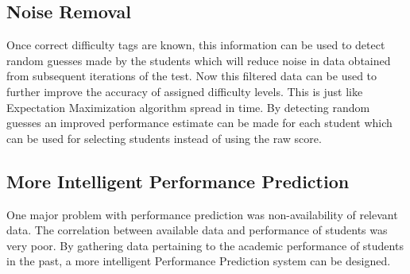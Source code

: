 \documentclass[12pt]{article}
\begin{document}
	\subsection{Noise Removal}
	Once correct difficulty tags are known, this information can be used
	to detect random guesses made by the students which will reduce noise
	in data obtained from subsequent iterations of the test. Now this filtered
	data can be used to further improve the accuracy of assigned difficulty
	levels. This is just like Expectation Maximization algorithm spread
	in time. By detecting random guesses an improved performance estimate
	can be made for each student which can be used for selecting students
	instead of using the raw score.
	
	\subsection{More Intelligent Performance Prediction}
	One major problem with performance prediction was non-availability
	of relevant data. The correlation between available data and performance
	of students was very poor. By gathering data pertaining to the academic
	performance of students in the past, a more intelligent Performance 
	Prediction system can be designed.
	
	\nocite{*}	
	
	\newpage
	\printbibliography[heading=bibintoc]
\end{document}
